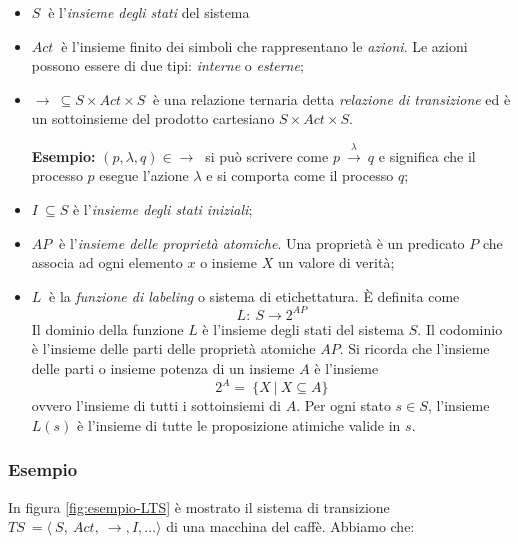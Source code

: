 \begin{itemize}
 \item $S\ $ è l'\emph{insieme degli stati} del sistema
 
 \item $Act\ $ è l'insieme finito dei simboli che rappresentano le \emph{azioni}. Le azioni possono essere di due tipi: \emph{interne} o \emph{esterne};
 
 \item $\rightarrow\ \subseteq S \times Act \times S\ $ è una relazione ternaria detta \emph{relazione di transizione} ed è un sottoinsieme del prodotto cartesiano $S \times Act \times S$.
 
 \textbf{Esempio:} $(p, \lambda, q) \in \rightarrow \ $ si può scrivere come $p\ \xrightarrow{\lambda}\ q$ e significa che il processo $p$ esegue l'azione $\lambda$ e si comporta come il processo $q$;
 
 \item $I\ \subseteq S $ è l'\emph{insieme degli stati iniziali};
 
 \item $AP\ $ è l'\emph{insieme delle proprietà atomiche}. Una proprietà è un predicato $P$ che associa ad ogni elemento $x$ o insieme $X$ un valore di verità;
 
 \item $L\ $ è la \emph{funzione di labeling} o sistema di etichettatura. È definita come
 \begin{equation}
  L:\ S \rightarrow 2^{AP}
 \end{equation}
 Il dominio della funzione $L$ è l'insieme degli stati del sistema $S$. Il codominio è l'insieme delle parti delle proprietà atomiche $AP$. Si ricorda che l'insieme delle parti o insieme potenza di un insieme $A$ è l'insieme
 \begin{equation}
  2^A=\ \{ X\ |\ X \subseteq A \}
 \end{equation}
 ovvero l'insieme di tutti i sottoinsiemi di $A$.
 Per ogni stato $s \in S$, l'insieme $L(s)$ è l'insieme di tutte le proposizione atimiche valide in $s$.
 
\end{itemize}

\subsubsection*{Esempio}

In figura \ref{fig:esempio-LTS} è mostrato il sistema di transizione $TS\ = \langle\ S,\ Act,\ \rightarrow , I, \dots \rangle$ di una macchina del caffè. Abbiamo che:

